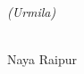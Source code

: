 





\vspace*{1.5cm}
\begin{flushright}
\begin{minipage}{7.0cm}
{\em (Urmila)}
\end{minipage}
\end{flushright}







\vspace*{-1.3cm}
\noindent
{}\\
 Naya Raipur\\
